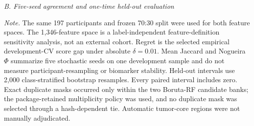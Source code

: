 \begin{table}[p]
\vspace{0.8em}
\textit{B. Five-seed agreement and one-time held-out evaluation}\par\smallskip
{}
\par\smallskip
\parbox{0.98\linewidth}{\scriptsize\textit{Note.} The same 197 participants and frozen 70:30 split were used for both feature spaces. The 1,346-feature space is a label-independent feature-definition sensitivity analysis, not an external cohort. Regret is the selected empirical development-CV score gap under absolute $\delta=0.01$. Mean Jaccard and Nogueira $\Phi$ summarize five stochastic seeds on one development sample and do not measure participant-resampling or biomarker stability. Held-out intervals use 2,000 class-stratified bootstrap resamples. Every paired interval includes zero. Exact duplicate masks occurred only within the two Boruta-RF candidate banks; the package-retained multiplicity policy was used, and no duplicate mask was selected through a hash-dependent tie. Automatic tumor-core regions were not manually adjudicated.}
\end{table}
